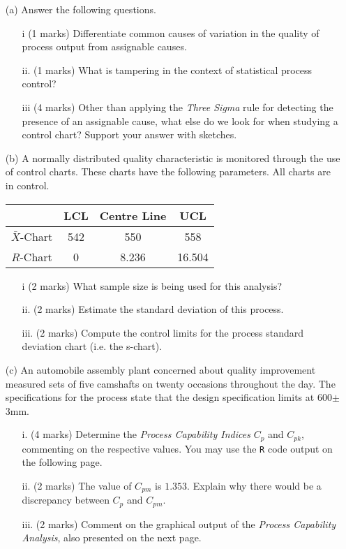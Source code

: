 \documentclass[a4paper,12pt]{article}
\begin{document}
\begin{itemize}
	\item[(a)] Answer the following questions.
	
	\begin{itemize}
		\item[i] (1 marks) Differentiate common causes of variation in the quality of process output from assignable causes.
		\item[ii.] (1 marks) What is tampering in the context of statistical process control?
		\item[iii] (4 marks) Other than applying the \emph{Three Sigma} rule for detecting the presence of an assignable cause, what else do we look for when studying a control chart? Support your answer with sketches.
	\end{itemize}
	
	\item[(b)] A normally distributed quality characteristic is monitored through the use of control charts. These charts have the following parameters. All charts are in control.
	\begin{center}
		\begin{tabular}{|c|c|c|c|}
			\hline  & LCL & Centre Line & UCL \\
			\hline $\bar{X}$-Chart & 542 & 550 & 558 \\
			\hline $R$-Chart & 0 & 8.236 & 16.504 \\ \hline
		\end{tabular}
	\end{center}
	
	\begin{itemize}
		\item[i] (2 marks) What sample size is being used for this analysis?
		\item[ii.] (2 marks) Estimate the standard deviation of this process.
		\item[iii.] (2 marks) Compute the control limits for the process standard deviation chart (i.e. the s-chart).
	\end{itemize}
	
	\item[(c)] An automobile assembly plant concerned about quality improvement measured sets of five camshafts on twenty occasions throughout the day. The specifications for the process state that the design specification limits at 600$\pm$3mm.
	
	
	\begin{itemize}
		\item[i.] (4 marks) Determine the \emph{Process Capability Indices} $C_p$ and $C_{pk}$, commenting on the respective values. You may use the \texttt{R} code output on the following page.
		\item[ii.] (2 marks)  The value of $C_{pm}$ is $1.353$. Explain why there would be a discrepancy between $C_p$ and $C_{pm}$.
		\item[iii.] (2 marks) Comment on the graphical output of the \emph{Process Capability Analysis}, also presented on the next page.
	\end{itemize}
	

\end{itemize}
\end{document}
